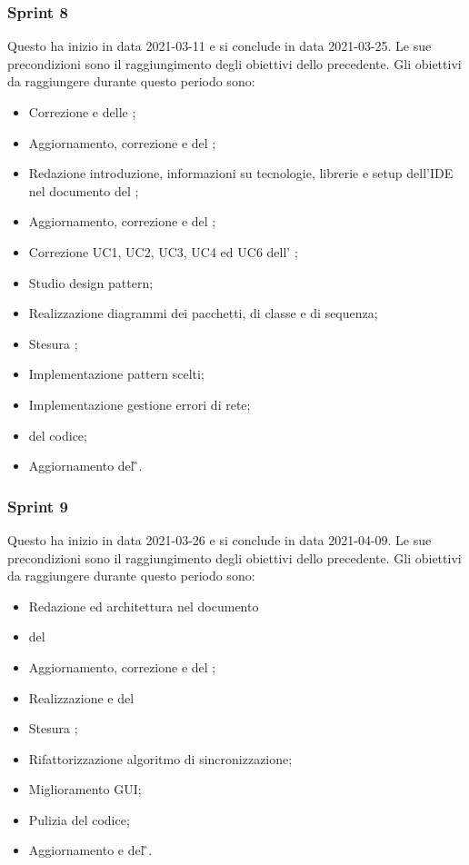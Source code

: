 \subsubsection{Sprint 8}
Questo  ha inizio in data 2021-03-11 e si conclude in data 2021-03-25.  Le sue precondizioni sono il raggiungimento degli obiettivi dello  precedente.\newline{}
Gli obiettivi da raggiungere durante questo periodo sono:
\begin{itemize}
	\item Correzione e  delle \NdP{};
	\item Aggiornamento, correzione e  del \PdP{};
	\item Redazione introduzione, informazioni su tecnologie, librerie e setup dell'IDE nel documento del \MS{};
	\item Aggiornamento, correzione e  del \PdQ{};
	\item Correzione UC1, UC2, UC3, UC4 ed UC6 dell' \AdR{};
	\item Studio design pattern;
	\item Realizzazione diagrammi dei pacchetti, di classe e di sequenza;
	\item Stesura ;
	\item Implementazione pattern scelti;
	\item Implementazione gestione errori di rete;
	\item {} del codice;
	\item Aggiornamento del \G{}.
\end{itemize}

\subsubsection{Sprint 9}
Questo  ha inizio in data 2021-03-26 e si conclude in data 2021-04-09. Le sue precondizioni sono il raggiungimento degli obiettivi dello  precedente.\newline{}
Gli obiettivi da raggiungere durante questo periodo sono:
\begin{itemize}
	\item Redazione  ed architettura nel documento \MS{}
	\item {} del \MS{}
	\item Aggiornamento, correzione e  del \PdP{};
	\item Realizzazione e  del \MU{}
	\item Stesura ;
	\item Rifattorizzazione algoritmo di sincronizzazione;
	\item Miglioramento GUI;
	\item Pulizia del codice;
	\item Aggiornamento e  del \G{}.
\end{itemize}
